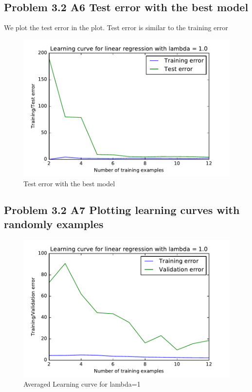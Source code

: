 \documentclass[pdftex,11pt]{article}
\begin{document}
\subsection{Problem 3.2 A6 Test error with the best model}
We plot the test error in the plot. Test error is similar to the training error
\begin{figure}
  \caption{Test error with the best model}
  \centering
    \includegraphics[scale=1]{figtest.pdf}
\end{figure}

\subsection{Problem 3.2 A7 Plotting learning curves with randomly examples}

\begin{figure}
  \caption{Averaged Learning curve for lambda=1}
  \centering
    \includegraphics[scale=1]{fig11.pdf}
\end{figure}
\end{document}
